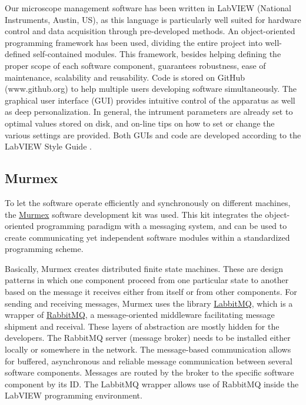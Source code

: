 \documentclass[12pt]{spieman}  %
\begin{document}
Our microscope management software has been written in LabVIEW (National Instruments, Austin, US), as this language is particularly well suited for hardware control and data acquisition through pre-developed methods. An object-oriented programming framework \cite{castagna1997object} has been used, dividing the entire project into well-defined self-contained modules. This framework, besides helping defining the proper scope of each software component, guarantees robustness, ease of maintenance, scalability and reusability. Code is stored on GitHub (www.github.org) to help multiple users developing software simultaneously. The graphical user interface (GUI) provides intuitive control of the apparatus as well as deep personalization. In general, the intrument parameters are already set to optimal values stored on disk, and on-line tips on how to set or change the various settings are provided. Both GUIs and code are developed according to the LabVIEW Style Guide \cite{}.

\subsection{Murmex}
To let the software operate efficiently and synchronously on different machines, the \href{http://sine.ni.com/nips/cds/view/p/lang/en/nid/212895}{Murmex} software development kit was used. This kit integrates the object-oriented programming paradigm with a messaging system, and can be used to create communicating yet independent software modules within a standardized programming scheme.

Basically, Murmex creates distributed finite state machines. These are design patterns in which one component proceed from one particular state to another based on the message it receives either from itself or from other components. For sending and receiving messages, Murmex uses the library \href{http://sine.ni.com/nips/cds/view/p/lang/en/nid/211065}{LabbitMQ}, which is a wrapper of \href{http://www.rabbitmq.com/}{RabbitMQ}, a message-oriented middleware facilitating message shipment and receival. These layers of abstraction are mostly hidden for the developers. The RabbitMQ server (message broker) needs to be installed either locally or somewhere in the network. The message-based communication allows for buffered, asynchronous and reliable message communication between several software components. Messages are routed by the broker to the specific software component by its ID. The LabbitMQ wrapper allows use of RabbitMQ inside the LabVIEW programming environment.
\end{document}
